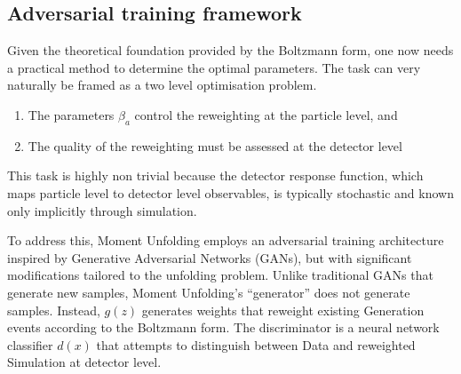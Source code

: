     \subsection{Adversarial training framework}
        Given the theoretical foundation provided by the Boltzmann form, one now needs a practical method to determine the optimal parameters.
        The task can very naturally be framed as a two level optimisation problem.
        \begin{enumerate}
            \item The parameters $\beta_a$ control the reweighting at the particle level, and
            \item The quality of the reweighting must be assessed at the detector level
        \end{enumerate}
        This task is highly non trivial because the detector response function, which maps particle level to detector level observables, is typically stochastic and known only implicitly through simulation.
    
        To address this, Moment Unfolding employs an adversarial training architecture inspired by Generative Adversarial Networks (GANs), but with significant modifications tailored to the unfolding problem.
        Unlike traditional GANs that generate new samples, Moment Unfolding's ``generator'' does not generate samples.
        Instead, $g(z)$ generates weights that reweight existing Generation events according to the Boltzmann form.
        The discriminator is a neural network classifier $d(x)$ that attempts to distinguish between Data and reweighted Simulation at detector level.


